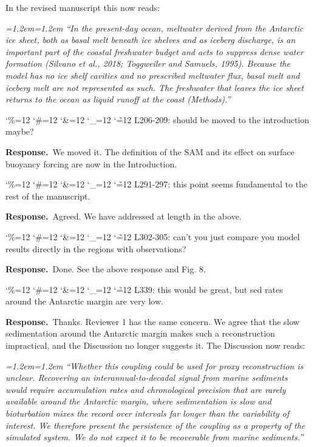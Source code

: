\documentclass[11pt,a4paper]{article}
\newcommand{\comment}[1]{\par\medskip\noindent\color{black}\begingroup\catcode`\%=12 \catcode`\#=12 \catcode`\&=12 \catcode`\_=12 \catcode`\~=12 \commentbody}
\newcommand{\commentbody}[1]{#1\endgroup\par\smallskip}
\newcommand{\response}{\par\noindent\color{chgcol}\textbf{Response.}\ }
\newenvironment{change}{\par\smallskip\color{chgcol}\small\itshape\leftskip=1.2em\rightskip=1.2em\noindent\ignorespaces}{\par\smallskip}
\begin{document}
In the revised manuscript this now reads:

\begin{change}
``In the present-day ocean, meltwater derived from the Antarctic ice sheet, both as basal melt beneath ice shelves and as iceberg discharge, is an important part of the coastal freshwater budget and acts to suppress dense water formation (Silvano et al., 2018; Toggweiler and Samuels, 1995). Because the model has no ice shelf cavities and no prescribed meltwater flux, basal melt and iceberg melt are not represented as such. The freshwater that leaves the ice sheet returns to the ocean as liquid runoff at the coast (Methods).'' %
\end{change}

\comment{R3}{L206-209: should be moved to the introduction maybe?}

\response We moved it. The definition of the SAM and its effect on surface buoyancy forcing are now in the Introduction.

\comment{R3}{L291-297: this point seems fundamental to the rest of the manuscript.}

\response Agreed. We have addressed at length in the above.

\comment{R3}{L302-305: can't you just compare you model results directly in the regions with observations?}

\response Done. See the above response and Fig. 8.

\comment{R3}{L339: this would be great, but sed rates around the Antarctic margin are very low.}

\response Thanks. Reviewer 1 has the same concern. We agree that the slow sedimentation around the Antarctic margin makes such a reconstruction impractical, and the Discussion no longer suggests it. The Discussion now reads:

\begin{change}
``Whether this coupling could be used for proxy reconstruction is unclear. Recovering an interannual-to-decadal signal from marine sediments would require accumulation rates and chronological precision that are rarely available around the Antarctic margin, where sedimentation is slow and bioturbation mixes the record over intervals far longer than the variability of interest. We therefore present the persistence of the coupling as a property of the simulated system. We do not expect it to be recoverable from marine sediments.''
\end{change} 
\end{document}
